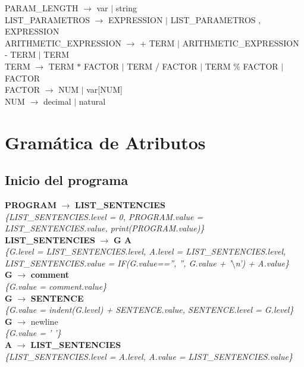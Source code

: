 \documentclass[10pt,a4paper]{article}
\begin{document}
PARAM\_LENGTH $\rightarrow$ var $|$ string \\

LIST\_PARAMETROS $\rightarrow$ EXPRESSION $|$ LIST\_PARAMETROS , EXPRESSION \\

ARITHMETIC\_EXPRESSION $\rightarrow$  + TERM $|$ ARITHMETIC\_EXPRESSION - TERM $|$ TERM \\

TERM $\rightarrow$ TERM $*$ FACTOR $|$ TERM $/$ FACTOR $|$ TERM \% FACTOR $|$ FACTOR \\

FACTOR $\rightarrow$ NUM $|$ var[NUM] \\

NUM $\rightarrow$ decimal $|$ natural


\section{Gramática de Atributos}

\subsection{Inicio del programa}
\textbf{PROGRAM} $\rightarrow$ \textbf{LIST\_SENTENCIES} \\
\textit{\{LIST\_SENTENCIES.level = 0, PROGRAM.value = LIST\_SENTENCIES.value, print(PROGRAM.value)\}}\\

\textbf{LIST\_SENTENCIES} $\rightarrow$ \textbf{G A}\\
\textit{\{G.level = LIST\_SENTENCIES.level, A.level = LIST\_SENTENCIES.level, LIST\_SENTENCIES.value = IF(G.value=='', '', G.value + '$\setminus$n') + A.value\}} \\

\textbf{G} $\rightarrow$ \textbf{comment} \\
\textit{\{G.value = comment.value\}} \\

\textbf{G} $\rightarrow$ \textbf{SENTENCE} \\
\textit{\{G.value = indent(G.level) + SENTENCE.value, SENTENCE.level = G.level\}} \\

\textbf{G} $\rightarrow$ newline \\
\textit{\{G.value = ' '\}} \\

\textbf{A} $\rightarrow$ \textbf{LIST\_SENTENCIES}\\
\textit{\{LIST\_SENTENCIES.level = A.level, A.value = LIST\_SENTENCIES.value\}} \\
\end{document}
